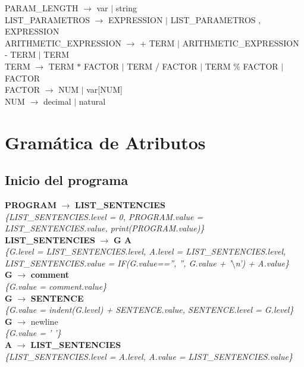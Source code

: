 \documentclass[10pt,a4paper]{article}
\begin{document}
PARAM\_LENGTH $\rightarrow$ var $|$ string \\

LIST\_PARAMETROS $\rightarrow$ EXPRESSION $|$ LIST\_PARAMETROS , EXPRESSION \\

ARITHMETIC\_EXPRESSION $\rightarrow$  + TERM $|$ ARITHMETIC\_EXPRESSION - TERM $|$ TERM \\

TERM $\rightarrow$ TERM $*$ FACTOR $|$ TERM $/$ FACTOR $|$ TERM \% FACTOR $|$ FACTOR \\

FACTOR $\rightarrow$ NUM $|$ var[NUM] \\

NUM $\rightarrow$ decimal $|$ natural


\section{Gramática de Atributos}

\subsection{Inicio del programa}
\textbf{PROGRAM} $\rightarrow$ \textbf{LIST\_SENTENCIES} \\
\textit{\{LIST\_SENTENCIES.level = 0, PROGRAM.value = LIST\_SENTENCIES.value, print(PROGRAM.value)\}}\\

\textbf{LIST\_SENTENCIES} $\rightarrow$ \textbf{G A}\\
\textit{\{G.level = LIST\_SENTENCIES.level, A.level = LIST\_SENTENCIES.level, LIST\_SENTENCIES.value = IF(G.value=='', '', G.value + '$\setminus$n') + A.value\}} \\

\textbf{G} $\rightarrow$ \textbf{comment} \\
\textit{\{G.value = comment.value\}} \\

\textbf{G} $\rightarrow$ \textbf{SENTENCE} \\
\textit{\{G.value = indent(G.level) + SENTENCE.value, SENTENCE.level = G.level\}} \\

\textbf{G} $\rightarrow$ newline \\
\textit{\{G.value = ' '\}} \\

\textbf{A} $\rightarrow$ \textbf{LIST\_SENTENCIES}\\
\textit{\{LIST\_SENTENCIES.level = A.level, A.value = LIST\_SENTENCIES.value\}} \\
\end{document}
